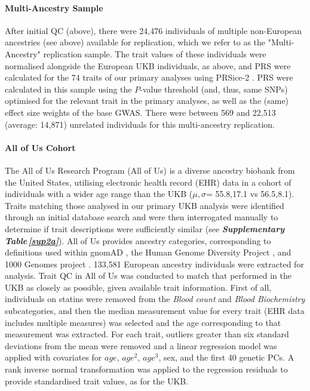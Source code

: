 \documentclass[12pt]{zHenriquesLab-StyleBioRxiv}
\newcommand\stref[1]{\normalsize{\textbf{\textit{Supplementary Table\,\ref{#1}}}}\normalsize{}}
\begin{document}
\paragraph*{Multi-Ancestry Sample}
After initial QC (above), there were 24,476 individuals of multiple non-European ancestries (see above) 
available for replication, which we refer to as the "Multi-Ancestry" replication sample. The trait values of 
these individuals were normalised alongside the European UKB individuals, as above, and PRS 
were calculated for the 74 traits of our primary analyses using PRSice-2 \cite{prsice}. 
PRS were calculated in this sample using the $P$-value threshold (and, thus, same SNPs) 
optimised for the relevant trait in the primary analyses, as well as the (same) effect 
size weights of the base GWAS. There were between 569 and 22,513 (average: 14,871) unrelated 
individuals for this multi-ancestry replication. 

\paragraph*{All of Us Cohort}
The All of Us Research Program (All of Us) is a diverse ancestry biobank from the United States, utilising 
electronic health record (EHR) data in a cohort of individuals with a wider age 
range than the UKB ($\mu,\sigma$= 55.8,17.1 vs 56.5,8.1). 
Traits matching those analysed in our primary UKB analysis 
were identified through an initial database search and were 
then interrogated manually to determine if trait descriptions 
were sufficiently similar (see \stref{sup2a}).  
All of Us provides ancestry categories, corresponding to definitions 
used within gnomAD \cite{gnomad}, 
the Human Genome Diversity Project \cite{hgdp}, 
and 1000 Genomes project \cite{tgp}.  
133,581  European ancestry individuals were extracted for analysis. 
Trait QC in All of Us was conducted to match that performed in the UKB as closely as possible, given 
available trait information. First of all, individuals on statins were removed 
from the \textit{Blood count} and \textit{Blood Biochemistry} subcategories, and then the 
median measurement value for every trait (EHR data includes multiple measures) was selected and 
the age corresponding to that measurement was extracted. For each trait, outliers greater 
than six standard deviations from the mean were removed and a linear regression model was 
applied with covariates for $age$, $age^2$, $age^3$, sex, and the first 40 genetic PCs. 
A rank inverse normal transformation was applied to the regression residuals to provide standardised trait values, as for the UKB.
\end{document}
